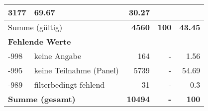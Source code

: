 \begin{longtable}{lXrrr}
       \num{3177} &
       \num[round-mode=places,round-precision=2]{69,67} &
         \num[round-mode=places,round-precision=2]{30,27} \\
     \midrule
     \multicolumn{2}{l}{Summe (gültig)} &
       \textbf{\num{4560}} &
     \textbf{100} &
       \textbf{\num[round-mode=places,round-precision=2]{43,45}} \\
     \multicolumn{5}{l}{\textbf{Fehlende Werte}}\\
       -998 &
       keine Angabe &
         \num{164} &
        - &
         \num[round-mode=places,round-precision=2]{1,56} \\
       -995 &
       keine Teilnahme (Panel) &
         \num{5739} &
        - &
         \num[round-mode=places,round-precision=2]{54,69} \\
       -989 &
       filterbedingt fehlend &
         \num{31} &
        - &
         \num[round-mode=places,round-precision=2]{0,3} \\
     \midrule
     \multicolumn{2}{l}{\textbf{Summe (gesamt)}} &
          \textbf{\num{10494}} &
        \textbf{-} &
        \textbf{100} \\
     \bottomrule
     \end{longtable}
     
